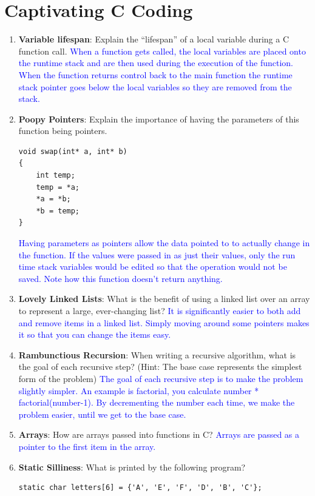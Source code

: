 \documentclass{article}
\begin{document}
\newpage
\section{Captivating C Coding}
\begin{enumerate}[label=(\alph*)]
    \item \textbf{Variable lifespan}: Explain the “lifespan” of a local variable during a C function call.
    \newline\textcolor{blue}{When a function gets called, the local variables are placed onto the runtime stack and are then used during the execution of the function. When the function returns control back to the main function the runtime stack pointer goes below the local variables so they are removed from the stack.
    }
    
    \item \textbf{Poopy Pointers}: Explain the importance of having the parameters of this function being pointers.
    
    \begin{lstlisting}[style=CStyle]
void swap(int* a, int* b)
{
    int temp;
    temp = *a;
    *a = *b;
    *b = temp;
} \end{lstlisting}

    \textcolor{blue}{Having parameters as pointers allow the data pointed to to actually change in the function. If the values were passed in as just their values, only the run time stack variables would be edited so that the operation would not be saved. Note how this function doesn't return anything.
    }
 
    \item \textbf{Lovely Linked Lists}: What is the benefit of using a linked list over an array to represent a large, ever-changing list?
    \newline\textcolor{blue}{It is significantly easier to both add and remove items in a linked list. Simply moving around some pointers makes it so that you can change the items easy.
    }
    \item \textbf{Rambunctious Recursion}: When writing a recursive algorithm, what is the goal of each recursive step? (Hint: The base case represents the simplest form of the problem)
    \newline\textcolor{blue}{The goal of each recursive step is to make the problem slightly simpler. An example is factorial, you calculate number * factorial(number-1). By decrementing the number each time, we make the problem easier, until we get to the base case.
    }
    \item \textbf{Arrays}: How are arrays passed into functions in C?
    \newline\textcolor{blue}{Arrays are passed as a pointer to the first item in the array. 
    }
    \item \textbf{Static Silliness}:  What is printed by the following program?
    \begin{lstlisting}[style=CStyle] 
static char letters[6] = {'A', 'E', 'F', 'D', 'B', 'C'};


\end{lstlisting}
\end{enumerate}
\end{document}
